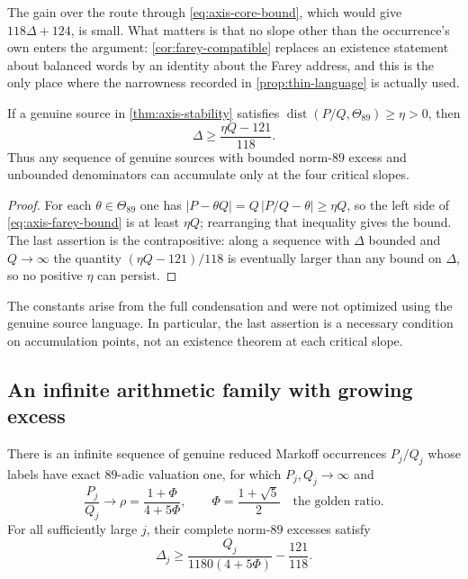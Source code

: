 The gain over the route through \eqref{eq:axis-core-bound}, which would
give $118\Delta+124$, is small. What matters is that no slope other than
the occurrence's own enters the argument: \cref{cor:farey-compatible}
replaces an existence statement about balanced words by an identity about
the Farey address, and this is the only place where the narrowness recorded
in \cref{prop:thin-language} is actually used.

\begin{corollary}
\label{cor:farey-penalty}
If a genuine source in \cref{thm:axis-stability} satisfies
$\operatorname{dist}(P/Q,\Theta_{89})\geqslant\eta>0$, then
$$
 \Delta\geqslant\frac{\eta Q-121}{118}.
$$
Thus any sequence of genuine sources with bounded norm-$89$ excess and
unbounded denominators can accumulate only at the four critical slopes.
\end{corollary}

\begin{proof}
For each $\theta\in\Theta_{89}$ one has
$|P-\theta Q|=Q\,|P/Q-\theta|\geqslant\eta Q$, so the left side of
\eqref{eq:axis-farey-bound} is at least $\eta Q$; rearranging that
inequality gives the bound. The last assertion is the contrapositive:
along a sequence with $\Delta$ bounded and $Q\to\infty$ the quantity
$(\eta Q-121)/118$ is eventually larger than any bound on $\Delta$, so no
positive $\eta$ can persist.
\end{proof}

The constants arise from the full condensation and were not optimized
using the genuine source language. In particular, the last assertion is
a necessary condition on accumulation points, not an existence theorem
at each critical slope.

\subsection{An infinite arithmetic family with growing excess}

\begin{theorem}
\label{thm:infinite-family}
There is an infinite sequence of genuine reduced Markoff occurrences
$P_j/Q_j$ whose labels have exact $89$-adic valuation one, for which
$P_j,Q_j\longrightarrow\infty$ and
\begin{equation}
 \frac{P_j}{Q_j}\longrightarrow
 \rho=\frac{1+\Phi}{4+5\Phi},\qquad
 \Phi=\frac{1+\sqrt5}{2}\quad\text{the golden ratio}.
 \label{eq:family-limit}
\end{equation}
For all sufficiently large $j$, their complete norm-$89$ excesses satisfy
\begin{equation}
 \Delta_j\geqslant\frac{Q_j}{1180(4+5\Phi)}-\frac{121}{118}.
 \label{eq:family-penalty}
\end{equation}
\end{theorem}

